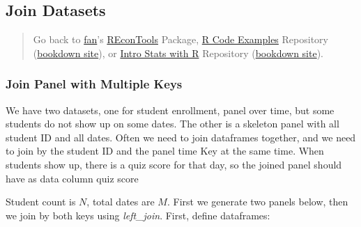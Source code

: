 \documentclass[
]{book}
\newenvironment{Shaded}{\begin{snugshade}}{\end{snugshade}}
\newcommand{\CommentTok}[1]{\textcolor[rgb]{0.56,0.35,0.01}{\textit{#1}}}
\newcommand{\DataTypeTok}[1]{\textcolor[rgb]{0.13,0.29,0.53}{#1}}
\newcommand{\DecValTok}[1]{\textcolor[rgb]{0.00,0.00,0.81}{#1}}
\newcommand{\ErrorTok}[1]{\textcolor[rgb]{0.64,0.00,0.00}{\textbf{#1}}}
\newcommand{\KeywordTok}[1]{\textcolor[rgb]{0.13,0.29,0.53}{\textbf{#1}}}
\newcommand{\NormalTok}[1]{#1}
\newcommand{\OperatorTok}[1]{\textcolor[rgb]{0.81,0.36,0.00}{\textbf{#1}}}
\newcommand{\StringTok}[1]{\textcolor[rgb]{0.31,0.60,0.02}{#1}}
\begin{document}
\hypertarget{join-datasets}{%
\subsection{Join Datasets}\label{join-datasets}}

\begin{quote}
Go back to \href{http://fanwangecon.github.io/}{fan}'s \href{https://fanwangecon.github.io/REconTools/}{REconTools} Package, \href{https://fanwangecon.github.io/R4Econ/}{R Code Examples} Repository (\href{https://fanwangecon.github.io/R4Econ/bookdown}{bookdown site}), or \href{https://fanwangecon.github.io/Stat4Econ/}{Intro Stats with R} Repository (\href{https://fanwangecon.github.io/Stat4Econ/bookdown}{bookdown site}).
\end{quote}

\hypertarget{join-panel-with-multiple-keys}{%
\subsubsection{Join Panel with Multiple Keys}\label{join-panel-with-multiple-keys}}

We have two datasets, one for student enrollment, panel over time, but some students do not show up on some dates. The other is a skeleton panel with all student ID and all dates. Often we need to join dataframes together, and we need to join by the student ID and the panel time Key at the same time. When students show up, there is a quiz score for that day, so the joined panel should have as data column quiz score

Student count is \(N\), total dates are \(M\). First we generate two panels below, then we join by both keys using \emph{left\_join}. First, define dataframes:

\begin{Shaded}
\end{Shaded}
\end{document}
